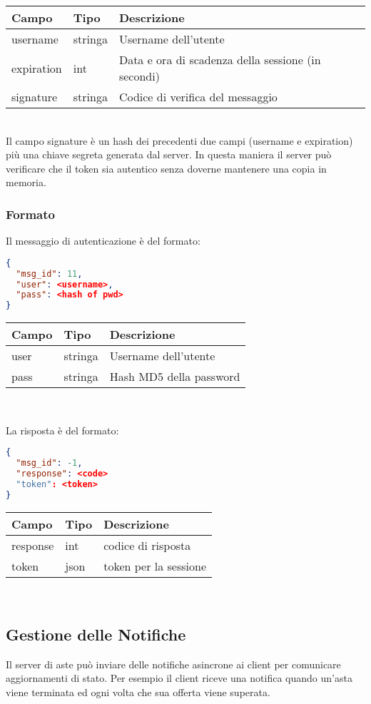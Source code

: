\begin{tabular}{|l | l | l|}
\hline
Campo & Tipo & Descrizione \\ \hline
username & stringa & Username dell'utente \\ \hline
expiration & int & Data e ora di scadenza della sessione (in secondi) \\ \hline
signature & stringa & Codice di verifica del messaggio\\ \hline
\end{tabular}\\

Il campo signature è un hash dei precedenti due campi (username e expiration) più una chiave segreta generata dal server.
In questa maniera il server può verificare che il token sia autentico senza doverne mantenere una copia in memoria.
\subsubsection{Formato}
Il messaggio di autenticazione è del formato:
\begin{lstlisting}[language=json]
{
  "msg_id": 11,
  "user": <username>,
  "pass": <hash of pwd>
}
\end{lstlisting}

\begin{tabular}{|l | l | l |}
\hline
Campo & Tipo & Descrizione \\ \hline
user & stringa & Username dell'utente \\ \hline
pass & stringa & Hash MD5 della password \\ \hline
\end{tabular} \\
\vspace*{1em}

La risposta è del formato:
\begin{lstlisting}[language=json]
{
  "msg_id": -1,
  "response": <code>
  "token": <token>
}
\end{lstlisting}

\begin{tabular}{|l | l | l |}
\hline
Campo & Tipo & Descrizione \\ \hline
response & int & codice di risposta  \\ \hline
token & json & token per la sessione \\ \hline
\end{tabular} \\
\subsection{Gestione delle Notifiche}
Il server di aste può inviare delle notifiche asincrone ai client per comunicare aggiornamenti di stato.
Per esempio il client riceve una notifica quando un'asta viene terminata ed ogni volta che sua offerta viene superata.\\

